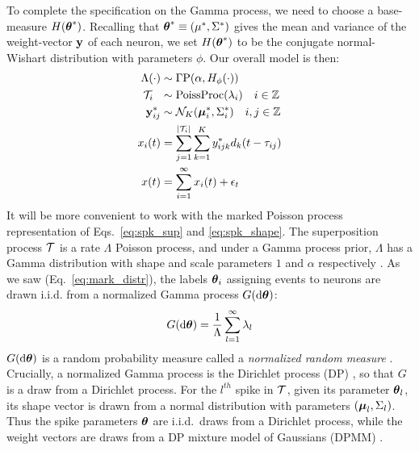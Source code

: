 To complete the specification on the Gamma process, we need to choose a base-measure $H(\boldsymbol{\theta}^*)$.
Recalling that $\boldsymbol{\theta}^* \equiv (\mu^*, \Sigma^*)$ gives the mean and variance of the weight-vector $\mathbf{y}$ of each neuron, we set $H(\boldsymbol{\theta}^*)$ 
to be the conjugate normal-Wishart distribution with parameters $\phi$. Our overall model is then:
\begin{subequations}
\begin{align}
  \Lambda(\cdot) & \sim \Gamma \text{P}(\alpha, H_{\phi}(\cdot)) \\ %
  \mc{T}_i\ \  &\sim \text{PoissProc}(\lambda_i) \quad i \in \ZZ \\
  \by^*_{ij} & \sim \mc{N}_K(\mb{\mu}^*_i, \Sigma^*_i) \quad i,j \in \ZZ \\
  x_i(t) &= \sum_{j = 1}^{|\mc{T}_i|}  \sum_{k = 1}^{K} y^*_{ijk} d_k(t - \tau_{ij}) \\
  x(t)   &= \sum_{i=1}^{\infty} x_i(t) + \epsilon_t
\end{align}
\end{subequations}
% 
It will be more convenient to work with the marked Poisson process representation of Eqs.~\eqref{eq:spk_sup} and \eqref{eq:spk_shape}. 
The superposition process $\mathcal{T}$ is a rate $\Lambda$ Poisson process,
and under a Gamma process prior, $\Lambda$ has a Gamma distribution with shape and scale parameters $1$ and $\alpha$ respectively \citep{Ferguson73}.
As we saw (Eq.~\eqref{eq:mark_distr}), the labels $\boldsymbol{\theta}_i$ assigning events to neurons are drawn i.i.d. from a normalized Gamma 
process $G(\mathrm{d} \boldsymbol{\theta})$:
\begin{align}
 G(\mathrm{d} \boldsymbol{\theta}) = \frac{1}{\Lambda} \sum_{l=1}^{\infty} \lambda_l
\end{align}
$G(\mathrm{d} \boldsymbol{\theta})$ is a random probability measure called a \emph{normalized random measure} \citep{JamesLP09}. Crucially, a 
normalized Gamma process is the Dirichlet process (DP) \citep{Ferguson73}, so that $G$ is a draw from a Dirichlet process. For the $l^{th}$ spike in $\mathcal{T}$, given its 
parameter $\boldsymbol{\theta}_l$, its shape vector is drawn from a normal distribution
with parameters $(\boldsymbol{\mu}_{l}, \Sigma_{l})$. Thus the spike parameters $\boldsymbol{\theta}$ are i.i.d.\ draws from a Dirichlet process, while the weight vectors are
draws from a DP mixture model of Gaussians (DPMM) \citep{Lo1984}.

